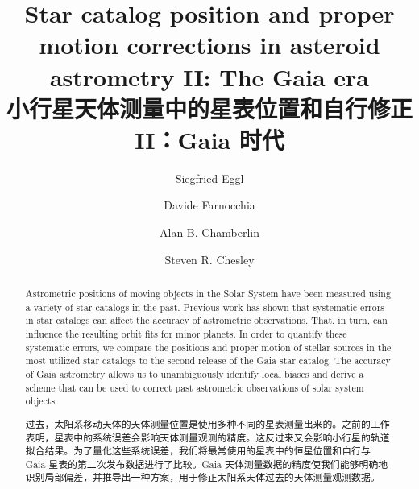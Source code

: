 \documentclass[review]{elsarticle}
\begin{document}
\begin{frontmatter}

\title{Star catalog position and proper motion corrections in
asteroid astrometry II: The Gaia era \\ \textnormal{\normalsize 小行星天体测量中的星表位置和自行修正 II：Gaia 时代}}


\author[JPL]{Siegfried Eggl}

\author[JPL]{Davide Farnocchia}
\author[JPL]{Alan B. Chamberlin}
\author[JPL]{Steven R. Chesley}


\address[JPL]{Jet Propulsion Laboratory, California Institute of Technology, 4800 Oak Grove Drive, 91101 Pasadena, CA, USA}




\begin{abstract}
Astrometric positions of moving objects in the Solar System have been measured using a variety of star catalogs in the past.
Previous work has shown that systematic errors in star catalogs can affect the accuracy of astrometric observations. That, in turn, can influence the resulting orbit fits for minor planets. In order to quantify these systematic errors, we compare the positions and proper motion of stellar sources in the most utilized star catalogs to the second release of the Gaia star catalog. The accuracy of Gaia astrometry allows us to unambiguously identify local biases and derive a scheme that can be used to correct past astrometric observations of solar system objects.

过去，太阳系移动天体的天体测量位置是使用多种不同的星表测量出来的。之前的工作表明，星表中的系统误差会影响天体测量观测的精度。这反过来又会影响小行星的轨道拟合结果。为了量化这些系统误差，我们将最常使用的星表中的恒星位置和自行与 Gaia 星表的第二次发布数据进行了比较。Gaia 天体测量数据的精度使我们能够明确地识别局部偏差，并推导出一种方案，用于修正太阳系天体过去的天体测量观测数据。


\end{abstract}
\end{frontmatter}
\end{document}

